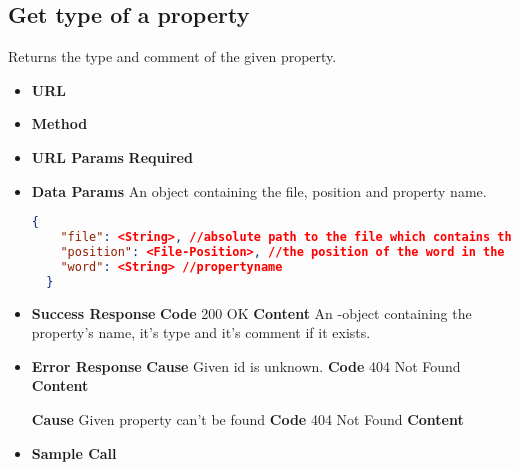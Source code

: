 \subsection{Get type of a property}
Returns the type and comment of the given property.
\begin{itemize}
\item \textbf{URL} 
\item \textbf{Method} 

\item \textbf{URL Params}
  \newline\textbf{Required} 

\item \textbf{Data Params} An object containing the file, position and property name.
  \newline{}
  \begin{lstlisting}[basicstyle=\small,language=json]
  {
    "file": <String>, //absolute path to the file which contains the word/symbol
    "position": <File-Position>, //the position of the word in the file
    "word": <String> //propertyname
  }
  \end{lstlisting}

\item \textbf{Success Response}
  \newline\textbf{Code} 200 OK
  \newline\textbf{Content} An -object containing the property's name,
  it's type and it's comment if it exists.

\item \textbf{Error Response}
  \newline\textbf{Cause} Given id is unknown.
  \newline\textbf{Code} 404 Not Found
  \newline\textbf{Content} 

  \fixedspace\textbf{Cause} Given property can't be found
  \newline\textbf{Code} 404 Not Found
  \newline\textbf{Content} 

\item \textbf{Sample Call}
\end{itemize}
